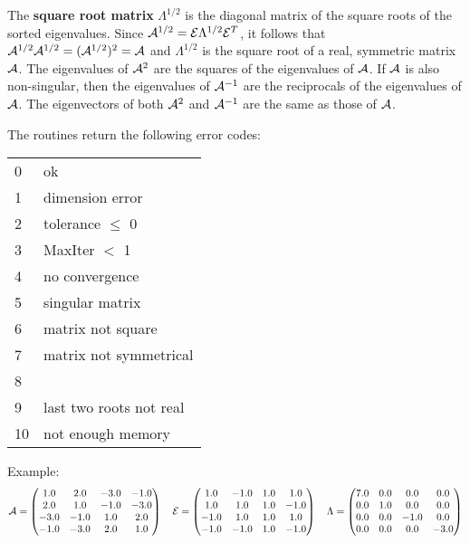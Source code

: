 The \textbf{square root matrix} \(\Lambda^{1/2} \) is the diagonal matrix of the square roots of the sorted eigenvalues. Since \(\mathcal{A}^{1/2} = \mathcal{E}\Lambda^{1/2}\mathcal{E}^T \), it follows that \(\mathcal{A}^{1/2} \mathcal{A}^{1/2} = (\mathcal{A}^{1/2})^2 = \mathcal{A} \) and \(\Lambda^{1/2} \) is the square root of a real, symmetric matrix \(\mathcal{A} \). The eigenvalues of \(\mathcal{A}^2 \) are the squares of the eigenvalues of \(\mathcal{A} \). If \(\mathcal{A} \) is also non-singular, then the eigenvalues of \(\mathcal{A}^{-1} \) are the reciprocals of the eigenvalues of \(\mathcal{A} \). The eigenvectors of both \(\mathcal{A}^2 \) and \(\mathcal{A}^{-1} \) are the same as those of \(\mathcal{A} \).

The routines return the following error codes:\\
\begin{tabular}{ll}
  0 & ok \\
  1 & dimension error \\
  2 & tolerance \(\leq \) 0 \\
  3 & MaxIter \(< \) 1 \\
  4 & no convergence \\
  5 & singular matrix \\
  6 & matrix not square \\
  7 & matrix not symmetrical \\
  8 &  \\
  9 & last two roots not real \\
 10 & not enough memory \\
\end{tabular}

Example:
\begin{gather} \mathcal{A} =
   \begin{pmatrix}
      1.0 &  2.0 & -3.0 & -1.0 \\
      2.0 &  1.0 & -1.0 & -3.0 \\
     -3.0 & -1.0 &  1.0 &  2.0 \\
     -1.0 & -3.0 &  2.0 &  1.0
   \end{pmatrix} \quad \mathcal{E}=
   \begin{pmatrix}
      1.0 & -1.0 & 1.0  &  1.0 \\
      1.0 &  1.0 & 1.0  & -1.0 \\
     -1.0 &  1.0 & 1.0  &  1.0 \\
     -1.0 & -1.0 & 1.0  & -1.0
   \end{pmatrix}\quad \Lambda =
   \begin{pmatrix}
      7.0 & 0.0 &  0.0 &  0.0 \\
      0.0 & 1.0 &  0.0 &  0.0 \\
      0.0 & 0.0 & -1.0 &  0.0 \\
      0.0 & 0.0 &  0.0 & -3.0
   \end{pmatrix}
\end{gather}

